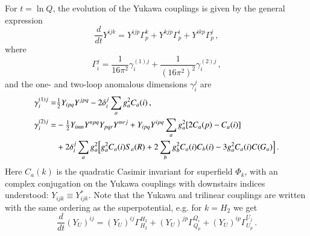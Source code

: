 \documentclass[final,3p,times,pdflatex]{elsarticle}
\newcommand{\dt}{\frac{d}{dt}}
\begin{document}
For $t = \ln Q$, the evolution of the Yukawa couplings is given by the general expression
%
\begin{equation}
\dt Y^{ijk} = Y^{ijp}\Gamma_p^k + Y^{kjp}\Gamma_p^i + Y^{ikp}\Gamma_p^j\,,
\end{equation}
%
where 
%
\begin{equation}
\Gamma_i^j = \frac{1}{16\pi^2}\gamma_i^{(1)j} 
+ \frac{1}{(16\pi^2)^2}\gamma_{i}^{(2)j}\,,
\end{equation}
%
and the one- and two-loop anomalous dimensions $\gamma_i^j$ are
%
\begin{align}
\gamma_i^{(1)j} =& \tfrac{1}{2}Y_{ipq}Y^{jpq} - 2\delta_i^j \sum_a g_a^2C_a(i)\,, \\
%
\gamma_i^{(2)j} =& -\tfrac{1}{2}Y_{imn}Y^{npq}Y_{pqr}Y^{mrj} 
+ Y_{ipq}Y^{ipq} \sum_a g_a^2[2C_a(p) - C_a(i)] \notag \\
%
&+ 2\delta_i^j \sum_a g_a^2 
\Big[g_a^2C_a(i)S_a(R) +2\sum_b g_b^2C_a(i)C_b(i) - 3g_a^2C_a(i)C(G_a)\Big]\,.
\end{align}
%
Here $C_a(k)$ is the quadratic Casimir invariant for superfield $\Phi_k$, with 
an complex conjugation on the Yukawa couplings with downstairs indices 
understood: $Y_{ijk} \equiv Y_{ijk}^*$.  Note that the Yukawa and trilinear 
couplings are written with the same ordering as the superpotential, e.g. for 
$k = H_2$ we get
%
\begin{equation}
\dt (Y_U)^{ij} = (Y_U)^{ij}\Gamma^{H_2}_{H_2} + (Y_U)^{jp}\Gamma_{Q_p}^{Q_i} + (Y_U)^{ip}\Gamma_{U_p}^{U_j}\,.
\end{equation}
\end{document}
